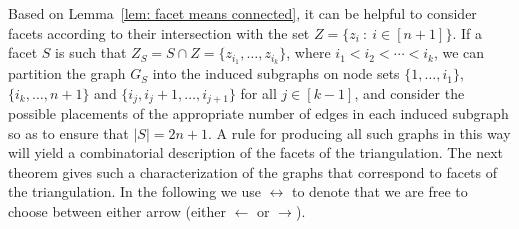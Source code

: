 Based on Lemma~\ref{lem: facet means connected}, it can be helpful to consider facets according to their intersection with the set $Z = \{z_i~ :~ i\in[n+1]\}$.  
If a facet $S$ is such that $Z_S = S\cap Z = \{z_{i_1},\ldots, z_{i_k}\}$, where $i_1<i_2<\cdots<i_k$, we can partition the graph $G_S$ into the induced subgraphs on node sets $\{1,\ldots, i_1\}$, $\{i_k,\ldots, n+1\}$ and $\{i_j, i_j+1,\ldots, i_{j+1}\}$ for all $j\in[k-1]$, and consider the possible placements of the appropriate number of edges in each induced subgraph so as to ensure that $|S| = 2n+1$.  
A rule for producing all such graphs in this way will yield a combinatorial description of the facets of the triangulation. 
The next theorem gives such a characterization of the graphs that correspond to facets of the triangulation.
In the following we use $\leftrightarrow$ to denote that we are free to choose between either arrow (either $\leftarrow$ or $\rightarrow$). 
